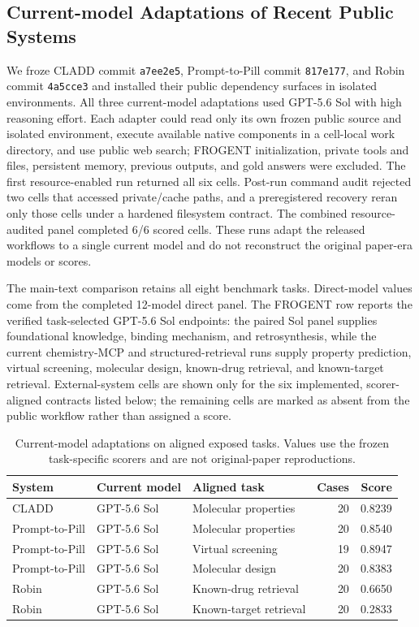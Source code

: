 \documentclass{article}
\begin{document}
\subsection{Current-model Adaptations of Recent Public Systems}

We froze CLADD commit \texttt{a7ee2e5}, Prompt-to-Pill commit \texttt{817e177}, and Robin commit \texttt{4a5cce3} and installed their public dependency surfaces in isolated environments. All three current-model adaptations used GPT-5.6 Sol with high reasoning effort. Each adapter could read only its own frozen public source and isolated environment, execute available native components in a cell-local work directory, and use public web search; FROGENT initialization, private tools and files, persistent memory, previous outputs, and gold answers were excluded. The first resource-enabled run returned all six cells. Post-run command audit rejected two cells that accessed private/cache paths, and a preregistered recovery reran only those cells under a hardened filesystem contract. The combined resource-audited panel completed 6/6 scored cells. These runs adapt the released workflows to a single current model and do not reconstruct the original paper-era models or scores.

The main-text comparison retains all eight benchmark tasks. Direct-model values come from the completed 12-model direct panel. The FROGENT row reports the verified task-selected GPT-5.6 Sol endpoints: the paired Sol panel supplies foundational knowledge, binding mechanism, and retrosynthesis, while the current chemistry-MCP and structured-retrieval runs supply property prediction, virtual screening, molecular design, known-drug retrieval, and known-target retrieval. External-system cells are shown only for the six implemented, scorer-aligned contracts listed below; the remaining cells are marked as absent from the public workflow rather than assigned a score.

\begin{table}[htbp]
\centering
\small
\caption{Current-model adaptations on aligned exposed tasks. Values use the frozen task-specific scorers and are not original-paper reproductions.}
\begin{tabular}{lp{2.7cm}p{3.1cm}rr}
\toprule
System & Current model & Aligned task & Cases & Score \\
\midrule
CLADD & GPT-5.6 Sol & Molecular properties & 20 & 0.8239 \\
Prompt-to-Pill & GPT-5.6 Sol & Molecular properties & 20 & 0.8540 \\
Prompt-to-Pill & GPT-5.6 Sol & Virtual screening & 19 & 0.8947 \\
Prompt-to-Pill & GPT-5.6 Sol & Molecular design & 20 & 0.8383 \\
Robin & GPT-5.6 Sol & Known-drug retrieval & 20 & 0.6650 \\
Robin & GPT-5.6 Sol & Known-target retrieval & 20 & 0.2833 \\
\bottomrule
\end{tabular}
\end{table}
\end{document}
